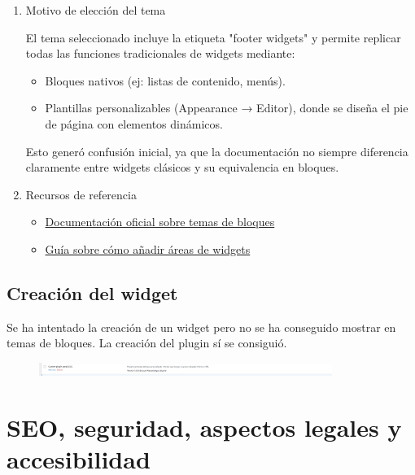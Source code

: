 \documentclass[a4paper]{article}
\begin{document}
\begin{enumerate}
    \item Motivo de elección del tema

    El tema seleccionado incluye la etiqueta "footer widgets" y permite replicar todas las funciones tradicionales de widgets mediante:

    \begin{itemize}
        \item Bloques nativos (ej: listas de contenido, menús).
        \item Plantillas personalizables (Appearance → Editor), donde se diseña el pie de página con elementos dinámicos.
    \end{itemize}

    Esto generó confusión inicial, ya que la documentación no siempre diferencia claramente entre widgets clásicos y su equivalencia en bloques.

    \item Recursos de referencia
        \begin{itemize}
            \item \href{https://wordpress.org/documentation/article/block-themes/#what-is-a-block-theme}{Documentación oficial sobre temas de bloques}
            \item \href{https://torquemag.io/2023/06/wordpress-widget-areas/}{Guía sobre cómo añadir áreas de widgets}
        \end{itemize}

\end{enumerate}

\subsection{Creación del widget}

Se ha intentado la creación de un widget pero no se ha conseguido mostrar en temas de bloques.
La creación del plugin sí se consiguió.

\begin{figure}[H]
    \centering
    \includegraphics[width=0.85\textwidth]{images/custom-plugin.png}
\end{figure}


\newpage


\section{SEO, seguridad, aspectos legales y accesibilidad}
\end{document}
